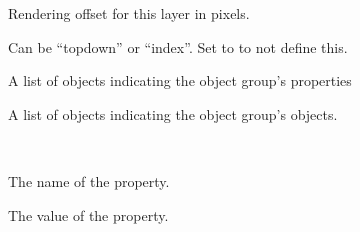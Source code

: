 \documentclass[letterpaper,10pt,english]{sphinxmanual}
\begin{document}
\begin{fulllineitems}
\begin{fulllineitems}
\label{index:tmx.ObjectGroup.offsety}
Rendering offset for this layer in pixels.

\end{fulllineitems}


\begin{fulllineitems}
\label{index:tmx.ObjectGroup.draworder}
Can be ``topdown'' or ``index''.  Set to  to not define
this.

\end{fulllineitems}


\begin{fulllineitems}
\label{index:tmx.ObjectGroup.properties}
A list of {\hyperref[index:tmx.Property]{\emph{}}} objects indicating the object group's
properties

\end{fulllineitems}



\begin{fulllineitems}
A list of {\hyperref[index:tmx.Object]{\emph{}}} objects indicating the object group's
objects.

\end{fulllineitems}


\end{fulllineitems}


\begin{fulllineitems}
\label{index:tmx.Property}~

\begin{fulllineitems}
\label{index:tmx.Property.name}
The name of the property.

\end{fulllineitems}


\begin{fulllineitems}
\label{index:tmx.Property.value}
The value of the property.

\end{fulllineitems}


\end{fulllineitems}
\end{document}
